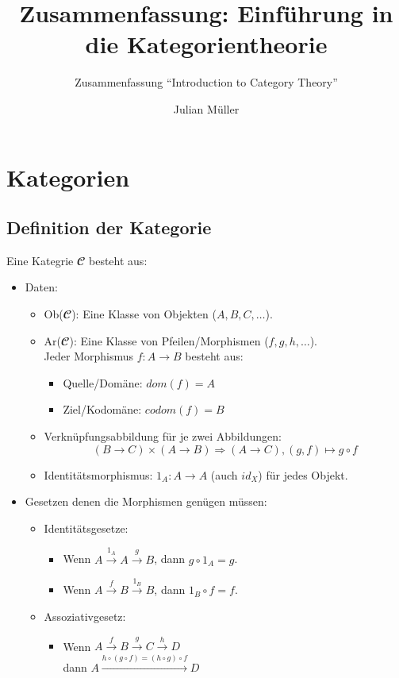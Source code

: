 \documentclass[parskip=half]{scrreprt}
\begin{document}
\title{Zusammenfassung: Einführung in die Kategorientheorie}
\subtitle{Zusammenfassung \enquote{Introduction to Category Theory}}
\author{Julian Müller}
\maketitle
\tableofcontents

\part{Kategorien}

\chapter{Definition der Kategorie}

\begin{definition}[Kategorie]
Eine Kategrie $𝓒$ besteht aus:
\begin{itemize}[leftmargin=1em]
\item Daten: 
	\begin{itemize}
	\item Ob($𝓒$): Eine Klasse von Objekten ($A, B, C, \dots$).
	\item Ar($𝓒$): Eine Klasse von Pfeilen/Morphismen ($f, g, h, \dots$). \\
		Jeder Morphismus $f : A → B$ besteht aus:
		\begin{itemize}
		\item Quelle/Domäne: $dom(f) = A$
		\item Ziel/Kodomäne: $codom(f) = B$
		\end{itemize}
	\item Verknüpfungsabbildung für je zwei Abbildungen:
		$$(B → C) × (A → B) ⇒ (A → C), (g,f) ↦ g ∘ f$$
	\item Identitätsmorphismus: $1_A : A → A$ (auch $id_X$) für jedes Objekt.
	\end{itemize}
\item Gesetzen denen die Morphismen genügen müssen:
	\begin{itemize}
	\item Identitätsgesetze:
		\begin{itemize}
		\item Wenn $A \xrightarrow{1_A} A \xrightarrow{g} B$, dann $g ∘ 1_A = g$.
		\item Wenn $A \xrightarrow{f} B \xrightarrow{1_B} B$, dann $1_B ∘ f = f$.
		\end{itemize}
	\item Assoziativgesetz:
		\begin{itemize}
		\item Wenn $A \xrightarrow{f} B \xrightarrow{g} C \xrightarrow{h} D$\\ 
			dann $A \xrightarrow{h∘(g∘f)=(h∘g)∘f} D $
		\end{itemize}
	\end{itemize}
\end{itemize}
\end{definition}
\end{document}
